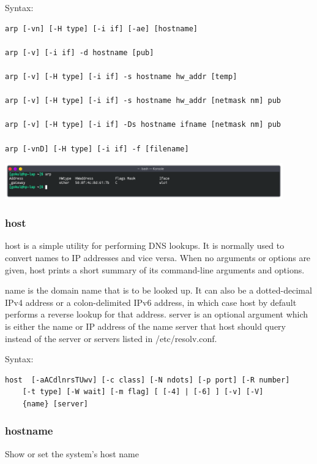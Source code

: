 Syntax:
\begin{lstlisting}
arp [-vn] [-H type] [-i if] [-ae] [hostname]

arp [-v] [-i if] -d hostname [pub]
 
arp [-v] [-H type] [-i if] -s hostname hw_addr [temp]
 
arp [-v] [-H type] [-i if] -s hostname hw_addr [netmask nm] pub
 
arp [-v] [-H type] [-i if] -Ds hostname ifname [netmask nm] pub
 
arp [-vnD] [-H type] [-i if] -f [filename] 
\end{lstlisting}

\begin{center}
	\includegraphics[width=0.90\textwidth]{img/p1/ss6.png}
\end{center}


\subsubsection{host}
host is a simple utility for performing DNS lookups. It is normally used to convert names to IP addresses and vice versa.
When no arguments or options are given, host prints a short summary of its command-line arguments and options.

name is the domain name that is to be looked up. It can also be a dotted-decimal IPv4 address or a colon-delimited IPv6
address, in which case host by default performs a reverse lookup for that address.  server is an optional argument  which
is  either  the  name  or IP address of the name server that host should query instead of the server or servers listed in
/etc/resolv.conf.
\linebreak[2]

Syntax:
\begin{lstlisting}
host  [-aACdlnrsTUwv] [-c class] [-N ndots] [-p port] [-R number] 
	[-t type] [-W wait] [-m flag] [ [-4] | [-6] ] [-v] [-V] 
	{name} [server]
\end{lstlisting}


\subsubsection{hostname}
Show or set the system's host name
\linebreak[2]

